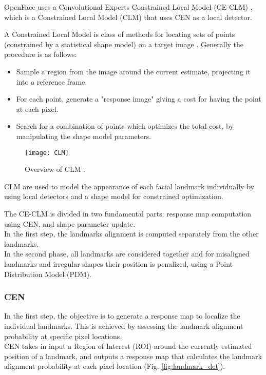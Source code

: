 OpenFace uses a Convolutional Experts Constrained Local Model (CE-CLM) \cite{Baltru2017}, which is a Constrained Local Model (CLM) that uses CEN as a local detector. 

A Constrained Local Model is class of methods for locating sets of points (constrained by a statistical shape model) on a target image \cite{clm_cootes}.
Generally the procedure is as follows:
\begin{itemize}
	\item Sample a region from the image around the current estimate, projecting it into a reference frame.
	\item For each point, generate a "response image" giving a cost for having the point at each pixel.
	\item Search for a combination of points which optimizes the total cost, by manipulating the shape model parameters.
\end{itemize}

\begin{figure}[H]
	\centering
	\texttt{[image: CLM]}
	\caption{Overview of CLM \cite{clm_cootes}.}
	\label{fig:CLM}
\end{figure}
 
CLM are used to model the appearance of each facial landmark individually by using local detectors and a shape model for constrained optimization. 

The CE-CLM is divided in two fundamental parts: response map computation using CEN, and shape parameter update. \\
In the first step, the landmarks alignment is computed separately from the other landmarks. \\
In the second phase, all landmarks are considered together and for misaligned landmarks and irregular shapes their position is penalized, using a Point Distribution Model (PDM).

\subsubsection{CEN}
In the first step, the objective is to generate a response map to localize the individual landmarks. This is achieved by assessing the landmark alignment probability at specific pixel locations. \\
CEN takes in input a Region of Interest (ROI) around the currently estimated position of a landmark, and outputs a response map that calculates the landmark alignment probability at each pixel location (Fig. \ref{fig:landmark_det}).

